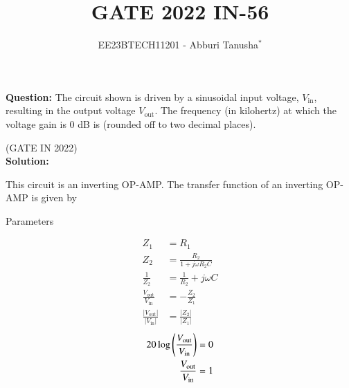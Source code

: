 \documentclass[journal,12pt,twocolumn]{IEEEtran}
\theoremstyle{remark}
\begin{document}

\vspace{3cm}

\title{GATE 2022 IN-56}
\author{EE23BTECH11201 - Abburi Tanusha$^{*}$%
}
\maketitle
\newpage
\bigskip

\renewcommand{\thefigure}{\theenumi}
\renewcommand{\thetable}{\theenumi}

\vspace{3cm}

\maketitle
\textbf{Question:} 
The circuit shown is driven by a sinusoidal input voltage, $V_{\text{in}}$, resulting in the output voltage $V_{\text{out}}$. The frequency (in kilohertz) at which the voltage gain is 0 dB is (rounded off to two decimal places).
\begin{figure}[htb]
	\centering
	
\end{figure}
\hfill(GATE IN 2022)\\
\textbf{Solution:} 

This circuit is an inverting OP-AMP. The transfer function of an inverting OP-AMP is given by\\
\begin{table}[h]
 	\centering
 	\resizebox{14 cm}{!}{
 		
 	}
 	\vspace{6 pt}
 	\caption{Parameters}
 \end{table}
\begin{align}
Z_1 &= R_1 \\
Z_2 &= \frac{R_2}{1+j \omega R_2C} \\
\frac{1}{Z_2} &= \frac{1}{R_2} + j\omega C \\
\frac{V_{\text{out}}}{V_{\text{in}}} &= -\frac{Z_2}{Z_1} \\
\frac{|V_{\text{out}}|}{|V_{\text{in}}|} &= \frac{|Z_2|}{|Z_1|} 
\end{align}
\begin{align}
20 \log \left(\frac{V_{\text{out}}}{V_{\text{in}}}\right) &= 0 \\
\frac{V_{\text{out}}}{V_{\text{in}}} &= 1
\end{align}
\end{document}
